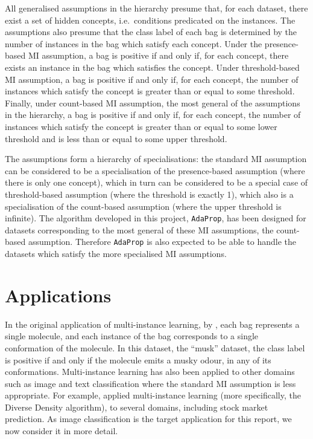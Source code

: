 \documentclass[a4paper,12pt]{report} %
\newcommand{\AdaProp}{\texttt{AdaProp}\xspace}
\begin{document}
All generalised assumptions in the  hierarchy 
	presume that, for each dataset, there exist a set of hidden concepts, 
	i.e.\ conditions predicated on the instances.
The assumptions also presume that the class label of each bag
	is determined by the number of instances in the bag which satisfy each concept.
Under the presence-based MI assumption, 
	a bag is positive if and only if, for each concept, there exists an instance
	in the bag which satisfies the concept.	
Under threshold-based MI assumption, 
	a bag is positive if and only if, for each concept, the number of 
	instances which satisfy the concept is greater than or equal to some threshold.
Finally, under count-based MI assumption, the most general of the assumptions in the hierarchy,
	a bag is positive if and only if, for each concept, the number of 
	instances which satisfy the concept is greater than or equal to some lower threshold 
	and is less than or equal to some upper threshold.
	
The assumptions form a hierarchy of specialisations:
the standard MI assumption can be considered to be a specialisation
	of the presence-based assumption (where there is only one concept), 
which in turn can be considered to be a special case of threshold-based assumption
	(where the threshold is exactly 1), 
which also is a specialisation of the 
	count-based assumption (where the upper threshold is infinite).		
The algorithm developed in this project, \AdaProp, 
    has been designed for datasets corresponding to the 
    most general of these MI assumptions, 
    the count-based assumption.
Therefore \AdaProp is also expected to be able to handle
    the datasets which satisfy the more specialised MI assumptions.
        
\section{Applications}
\label{sec:bg:app}

In the original application of multi-instance learning, 
    by ,
    each bag represents a single molecule, 
    and each instance of the bag corresponds to a single conformation
    of the molecule.
In this dataset, the ``musk'' dataset, the class label is positive if and only if 
    the molecule emits a musky odour, in any of its conformations.
Multi-instance learning has also been applied to other domains 
    such as image and text classification where 
    the standard MI assumption is less appropriate.
For example,  applied multi-instance learning 
    (more specifically, the Diverse Density algorithm),
    to several domains, including stock market prediction.
As image classification is the target application for this report,
	we now consider it in more detail.
\end{document}
